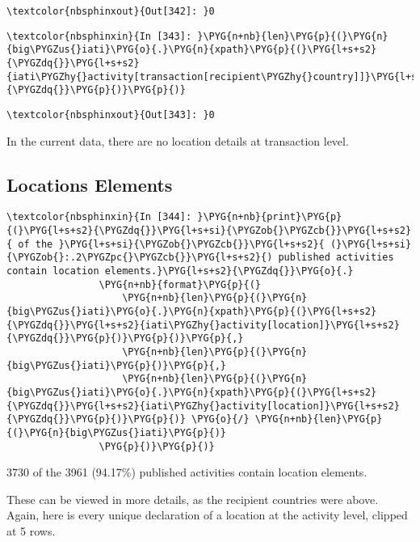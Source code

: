 \documentclass[letterpaper,10pt,english]{sphinxmanual}
\begin{document}
\begin{Verbatim}[commandchars=\\\{\}]
\textcolor{nbsphinxout}{Out[342]: }0
\end{Verbatim}

\begin{Verbatim}[commandchars=\\\{\}]
\textcolor{nbsphinxin}{In [343]: }\PYG{n+nb}{len}\PYG{p}{(}\PYG{n}{big\PYGZus{}iati}\PYG{o}{.}\PYG{n}{xpath}\PYG{p}{(}\PYG{l+s+s2}{\PYGZdq{}}\PYG{l+s+s2}{iati\PYGZhy{}activity[transaction[recipient\PYGZhy{}country]]}\PYG{l+s+s2}{\PYGZdq{}}\PYG{p}{)}\PYG{p}{)}
\end{Verbatim}

\begin{Verbatim}[commandchars=\\\{\}]
\textcolor{nbsphinxout}{Out[343]: }0
\end{Verbatim}

In the current data, there are no location details at transaction level.


\subsection{Locations Elements}
\label{\detokenize{Global Affairs Canada - Compliance Report:Locations-Elements}}
\begin{Verbatim}[commandchars=\\\{\}]
\textcolor{nbsphinxin}{In [344]: }\PYG{n+nb}{print}\PYG{p}{(}\PYG{l+s+s2}{\PYGZdq{}}\PYG{l+s+si}{\PYGZob{}\PYGZcb{}}\PYG{l+s+s2}{ of the }\PYG{l+s+si}{\PYGZob{}\PYGZcb{}}\PYG{l+s+s2}{ (}\PYG{l+s+si}{\PYGZob{}:.2\PYGZpc{}\PYGZcb{}}\PYG{l+s+s2}{) published activities contain location elements.}\PYG{l+s+s2}{\PYGZdq{}}\PYG{o}{.}
                \PYG{n+nb}{format}\PYG{p}{(}
                    \PYG{n+nb}{len}\PYG{p}{(}\PYG{n}{big\PYGZus{}iati}\PYG{o}{.}\PYG{n}{xpath}\PYG{p}{(}\PYG{l+s+s2}{\PYGZdq{}}\PYG{l+s+s2}{iati\PYGZhy{}activity[location]}\PYG{l+s+s2}{\PYGZdq{}}\PYG{p}{)}\PYG{p}{)}\PYG{p}{,}
                    \PYG{n+nb}{len}\PYG{p}{(}\PYG{n}{big\PYGZus{}iati}\PYG{p}{)}\PYG{p}{,}
                    \PYG{n+nb}{len}\PYG{p}{(}\PYG{n}{big\PYGZus{}iati}\PYG{o}{.}\PYG{n}{xpath}\PYG{p}{(}\PYG{l+s+s2}{\PYGZdq{}}\PYG{l+s+s2}{iati\PYGZhy{}activity[location]}\PYG{l+s+s2}{\PYGZdq{}}\PYG{p}{)}\PYG{p}{)} \PYG{o}{/} \PYG{n+nb}{len}\PYG{p}{(}\PYG{n}{big\PYGZus{}iati}\PYG{p}{)}
                \PYG{p}{)}\PYG{p}{)}
\end{Verbatim}
%
\begin{OriginalVerbatim}[commandchars=\\\{\}]
3730 of the 3961 (94.17\%) published activities contain location elements.
\end{OriginalVerbatim}
\relax
These can be viewed in more details, as the recipient countries were
above. Again, here is every unique declaration of a location at the
activity level, clipped at 5 rows.
\end{document}
